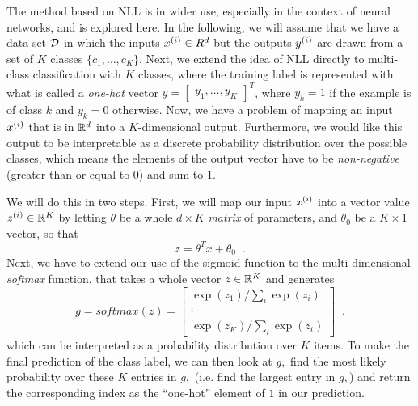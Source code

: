   The method based on NLL is in wider use, especially in the context of
  neural networks, and is explored here.
  In the following, we will assume that we have a data set ${\cal D}$ in
  which the inputs
$x^{(i)} \in R^d$ but the outputs $y^{(i)}$ are drawn from a set
  of $K$ classes $\{c_1, \ldots, c_K\}$.
  Next, we extend the idea of NLL directly to multi-class
  classification with $K$ classes, where the training label is
  represented with what is called a {\em one-hot} vector
$y=\begin{bmatrix} y_1, \ldots, y_K \end{bmatrix}^T$, where $y_k=1$ if
  the example is of class $k$ and $y_k = 0$ otherwise.
  Now, we have a problem of mapping an input $x^{(i)}$ that is in
$\mathbb{R}^d$ into a $K$-dimensional output.  Furthermore, we would like this
  output to be interpretable as a discrete probability distribution over
  the possible classes, which means the elements of the output vector have to
  be {\em non-negative} (greater than or equal to 0) and sum to 1.

  We will do this in two steps.  First, we will map our input
$x^{(i)}$ into a vector value $z^{(i)} \in \mathbb{R}^K$ by letting $\theta$ be a
  whole $d \times K$ {\em matrix} of parameters, and $\theta_0$ be a $K
\times 1$ vector, so that
  \[z = \theta^T x + \theta_0\;\;.\]%
%
Next, we have to extend our use of the sigmoid function to the
  multi-dimensional {\em softmax} function, that takes
  a whole vector $z \in \mathbb{R}^K$ and generates
  \[g = \textit{softmax}(z) =
    \begin{bmatrix}
      \exp(z_1) / \sum_{i} \exp(z_i) \\
      \vdots                         \\
      \exp(z_K) / \sum_{i} \exp(z_i)
    \end{bmatrix}\;\;.\]
  which can be interpreted as a probability distribution over $K$ items. To make the final prediction of the class label, we can then look at $g,$ find the most likely probability over these $K$ entries in $g,$ (i.e. find the largest entry in $g,$) and return the corresponding index as the ``one-hot'' element of $1$ in our prediction.


